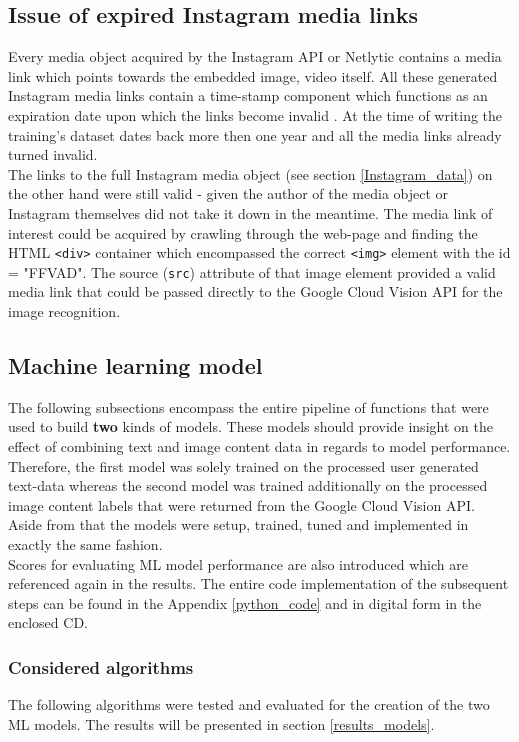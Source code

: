 \subsection{Issue of expired Instagram media links} \label{expired_media_links}
Every media object acquired by the Instagram API or Netlytic contains a media link which points towards the embedded image, video itself. All these generated Instagram media links contain a time-stamp component which functions as an expiration date upon which the links become invalid \parencite{Wayne2018}. At the time of writing the training's dataset dates back more then one year and all the media links already turned invalid.\\
The links to the full Instagram media object (see section \ref{Instagram_data}) on the other hand were still valid - given the author of the media object or Instagram themselves did not take it down in the meantime. The media link of interest could be acquired by crawling through the web-page and finding the HTML \texttt{<div>} container which encompassed the correct \texttt{<img>} element with the id = "FFVAD". The source (\texttt{src}) attribute of that image element provided a valid media link that could be passed directly to the Google Cloud Vision API for the image recognition.

\subsection{Machine learning model} \label{ml_model}
The following subsections encompass the entire pipeline of functions that were used to build \textbf{two} kinds of models. These models should provide insight on the effect of combining text and image content data in regards to model performance. Therefore, the first model was solely trained on the processed user generated text-data whereas the second model was trained additionally on the processed image content labels that were returned from the Google Cloud Vision API. Aside from that the models were setup, trained, tuned and implemented in exactly the same fashion.\\
Scores for evaluating ML model performance are also introduced which are referenced again in the results. The entire code implementation of the subsequent steps can be found in the Appendix \ref{python_code} and in digital form in the enclosed CD.

\subsubsection*{Considered algorithms} \label{ml_algorithms}
The following algorithms were tested and evaluated for the creation of the two ML models. The results will be presented in section \ref{results_models}.

